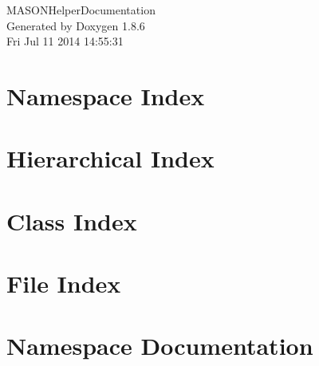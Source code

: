 \documentclass[twoside]{book}
\newcommand{\clearemptydoublepage}{%
  \newpage{\pagestyle{empty}\cleardoublepage}%
}
\begin{document}
\hypersetup{pageanchor=false}
\begin{titlepage}
\vspace*{7cm}
\begin{center}%
{\Large M\-A\-S\-O\-N\-Helper\-Documentation }\\
\vspace*{1cm}
{\large Generated by Doxygen 1.8.6}\\
\vspace*{0.5cm}
{\small Fri Jul 11 2014 14:55:31}\\
\end{center}
\end{titlepage}
\clearemptydoublepage
\tableofcontents
\clearemptydoublepage
{}
\hypersetup{pageanchor=true}

\chapter{Namespace Index}

\chapter{Hierarchical Index}

\chapter{Class Index}

\chapter{File Index}

\chapter{Namespace Documentation}














\end{document}

